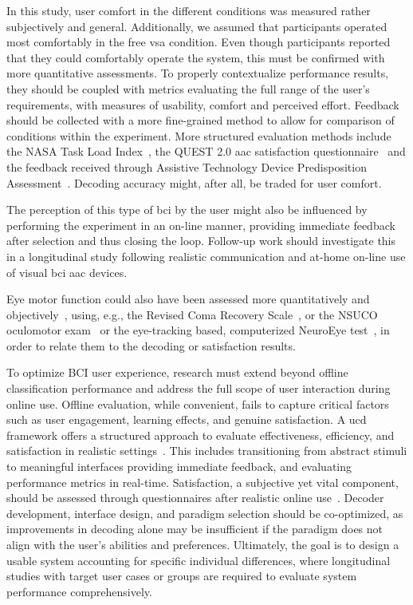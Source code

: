 \documentclass{article}
\begin{document}
In this study, user comfort in the different conditions was measured rather
subjectively and general.
Additionally, we assumed that participants operated most comfortably in the free
\ac{vsa} condition.
Even though participants reported that they could comfortably operate the
system, this must be confirmed with more quantitative assessments.
To properly contextualize performance results, they should be coupled with
metrics evaluating the full range of the user's requirements, with measures of
usability, comfort and perceived effort.
Feedback should be collected with a more fine-grained method to allow
for comparison of conditions within the experiment.
More structured evaluation methods include the NASA Task Load Index~\cite{Hart2006},
the QUEST 2.0  \ac{aac} satisfaction questionnaire~\cite{Demers2002} and the
feedback received through Assistive Technology Device Predisposition
Assessment~\cite{Scherer2005}.
Decoding accuracy might, after all, be traded for user comfort.

The perception of this type of \ac{bci} by the user might also be influenced by
performing the experiment in an on-line manner, providing immediate feedback
after selection and thus closing the loop.
Follow-up work should investigate this in a longitudinal study following
realistic communication and at-home on-line use of visual \ac{bci} \ac{aac} devices.

Eye motor function could also have been assessed more quantitatively and
objectively~\cite{FriedOken2020}, using, e.g.,
the Revised Coma Recovery Scale~\cite{Giacino2004}, or the NSUCO
oculomotor exam~\cite{Maples1992} or the eye-tracking based, computerized NeuroEye
test~\cite{Hassan2022}, in order to relate them to the decoding or satisfaction results.


To optimize BCI user experience, research must extend beyond offline classification
performance and address the full scope of user interaction during online use.
Offline evaluation, while convenient, fails to capture critical factors such as
user engagement, learning effects, and genuine satisfaction.
A \ac{ucd} framework offers a structured approach to evaluate
effectiveness, efficiency, and satisfaction in realistic
settings~\cite{Standardization2009,Schreuder2013,Kuebler2014,Han2022}.
This includes transitioning from abstract stimuli to meaningful interfaces
providing immediate feedback, and evaluating performance metrics in real-time.
Satisfaction, a subjective yet vital component, should be assessed through
questionnaires after realistic online use~\cite{Kuebler2014}.
Decoder development, interface design, and paradigm selection should be
co-optimized, as improvements in decoding alone may be insufficient if the
paradigm does not align with the user’s abilities and preferences.
Ultimately, the goal is to design a usable system accounting for specific individual
differences, where longitudinal studies with target user cases or groups are required to evaluate system performance comprehensively.
\end{document}
